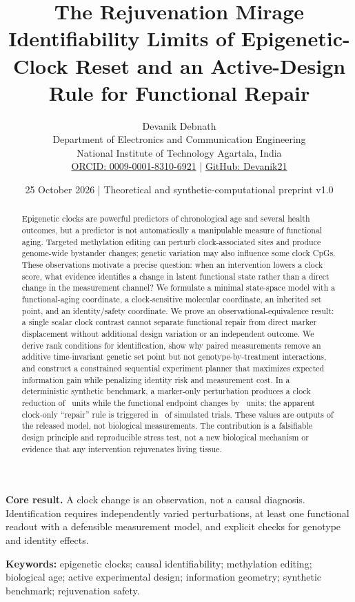 \documentclass[10pt,a4paper]{article}
\title{\vspace{-1.5em}\textbf{\color{ink}The Rejuvenation Mirage}\\[0.35em]\large Identifiability Limits of Epigenetic-Clock Reset and an Active-Design Rule for Functional Repair}
\author{Devanik Debnath\\[0.25em]\small Department of Electronics and Communication Engineering\\\small National Institute of Technology Agartala, India\\\small \href{https://orcid.org/0009-0001-8310-6921}{ORCID: 0009-0001-8310-6921} \;|\; \href{https://github.com/Devanik21}{GitHub: Devanik21}}
\date{25 October 2026 \;|\; Theoretical and synthetic-computational preprint v1.0}
\begin{document}
\maketitle
\vspace{-0.7em}
\begin{abstract}
Epigenetic clocks are powerful predictors of chronological age and several health outcomes, but a predictor is not automatically a manipulable measure of functional aging. Targeted methylation editing can perturb clock-associated sites and produce genome-wide bystander changes; genetic variation may also influence some clock CpGs. These observations motivate a precise question: when an intervention lowers a clock score, what evidence identifies a change in latent functional state rather than a direct change in the measurement channel? We formulate a minimal state-space model with a functional-aging coordinate, a clock-sensitive molecular coordinate, an inherited set point, and an identity/safety coordinate. We prove an observational-equivalence result: a single scalar clock contrast cannot separate functional repair from direct marker displacement without additional design variation or an independent outcome. We derive rank conditions for identification, show why paired measurements remove an additive time-invariant genetic set point but not genotype-by-treatment interactions, and construct a constrained sequential experiment planner that maximizes expected information gain while penalizing identity risk and measurement cost. In a deterministic synthetic benchmark, a marker-only perturbation produces a clock reduction of \ClockOnlyMean\ units while the functional endpoint changes by \FunctionalOnlyMean\ units; the apparent clock-only “repair” rule is triggered in \FalsePositiveRate\ of simulated trials. These values are outputs of the released model, not biological measurements. The contribution is a falsifiable design principle and reproducible stress test, not a new biological mechanism or evidence that any intervention rejuvenates living tissue.
\end{abstract}
\begin{keybox}
\textbf{Core result.} A clock change is an observation, not a causal diagnosis. Identification requires independently varied perturbations, at least one functional readout with a defensible measurement model, and explicit checks for genotype and identity effects.
\end{keybox}
\noindent\textbf{Keywords:} epigenetic clocks; causal identifiability; methylation editing; biological age; active experimental design; information geometry; synthetic benchmark; rejuvenation safety.
\end{document}

